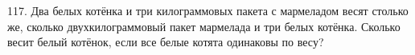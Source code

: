 117. Два белых котёнка и три килограммовых пакета с мармеладом весят столько же, сколько двухкилограммовый пакет мармелада и три белых котёнка. Сколько весит белый котёнок, если все белые котята одинаковы по весу?\\
